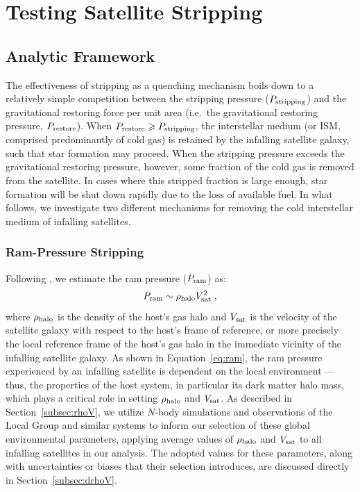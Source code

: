 \documentclass[usenatbib]{mn2e}
\begin{document}
\section{Testing Satellite Stripping}
\label{sec:rps}

\subsection{Analytic Framework}
\label{subsec:af}
The effectiveness of stripping as a quenching mechanism boils down to
a relatively simple competition between the stripping pressure
($P_{\rm stripping}$) and the gravitational restoring force per unit
area (i.e.~the gravitational restoring pressure, $P_{\rm restore}$).
%
When $P_{\rm restore} \ge P_{\rm stripping}$, the interstellar medium
(or ISM, comprised predominantly of cold gas) is retained by the
infalling satellite galaxy, such that star formation may proceed.
%
When the stripping pressure exceeds the gravitational restoring
pressure, however, some fraction of the cold gas is removed from the
satellite. In cases where this stripped fraction is large enough, star
formation will be shut down rapidly due to the loss of available fuel.
%
In what follows, we investigate two different mechanisms for removing
the cold interstellar medium of infalling satellites.
%

\subsubsection{Ram-Pressure Stripping}
%
Following \citet{gunn72}, we estimate the ram pressure ($P_{\rm ram}$)
as:
%
\begin{equation}
P_{\rm ram} \sim \rho_{\rm halo} V_{\rm sat}^{2} \; ,
\label{eq:ram}
\end{equation}
%
where $\rho_{\rm halo}$ is the density of the host's gas halo and
$V_{\rm sat}$ is the velocity of the satellite galaxy with respect to
the host's frame of reference, or more precisely the local reference
frame of the host's gas halo in the immediate vicinity of the
infalling satellite galaxy.
%
As shown in Equation~\ref{eq:ram}, the ram pressure experienced by an
infalling satellite is dependent on the local environment --- thus,
the properties of the host system, in particular its dark matter halo
mass, which plays a critical role in setting $\rho_{\rm halo}$ and
$V_{\rm sat}$.
% 
As described in Section~\ref{subsec:rhoV}, we utilize $N$-body
simulations and observations of the Local Group and similar systems to
inform our selection of these global environmental parameters,
applying average values of $\rho_{\rm halo}$ and $V_{\rm sat}$ to all
infalling satellites in our analysis.
%
The adopted values for these parameters, along with uncertainties or
biases that their selection introduces, are discussed directly in
Section~\ref{subsec:drhoV}.
%
\end{document}
